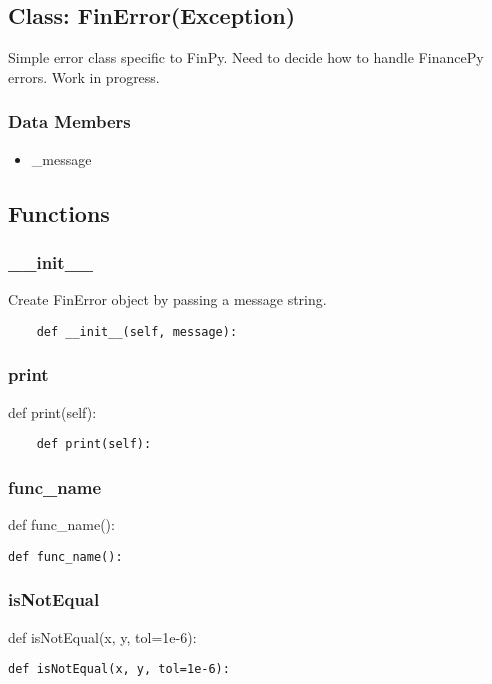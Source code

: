 \documentclass[twoside,11pt]{book}
\begin{document}
\subsection*{Class: FinError(Exception)}
Simple error class specific to FinPy. Need to decide how to handle FinancePy errors. Work in progress.  

\subsubsection*{Data Members}
\begin{itemize}
\item{\_message}
\end{itemize}

\subsection*{Functions}

\subsubsection*{{\bf \_\_init\_\_}}
Create FinError object by passing a message string.  

\begin{lstlisting}
    def __init__(self, message):
\end{lstlisting}

\subsubsection*{{\bf print}}
def print(self): 

\begin{lstlisting}
    def print(self):
\end{lstlisting}

\subsubsection*{{\bf func\_name}}
def func\_name(): 

\begin{lstlisting}
def func_name():
\end{lstlisting}

\subsubsection*{{\bf isNotEqual}}
def isNotEqual(x, y, tol=1e-6): 

\begin{lstlisting}
def isNotEqual(x, y, tol=1e-6):
\end{lstlisting}
\end{document}
